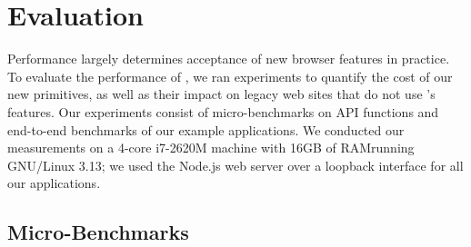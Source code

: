 \section{Evaluation}
\label{sec:eval}

Performance largely determines acceptance of new browser features
in practice.
%
To evaluate the performance of \sys{}, we ran experiments to quantify
the cost of our new primitives, as well as their impact on legacy web
sites that do not use \sys{}'s features.
%
Our experiments consist of micro-benchmarks on API functions and
end-to-end benchmarks of our example applications.
%
We conducted our measurements on a 4-core i7-2620M machine with 16GB
of RAM\@ running GNU/Linux 3.13; we used the Node.js web server
over a loopback interface for all our applications.

\subsection{Micro-Benchmarks}
\label{sec:eval:micro}

\newcommand*\rot{\rotatebox{90}}


